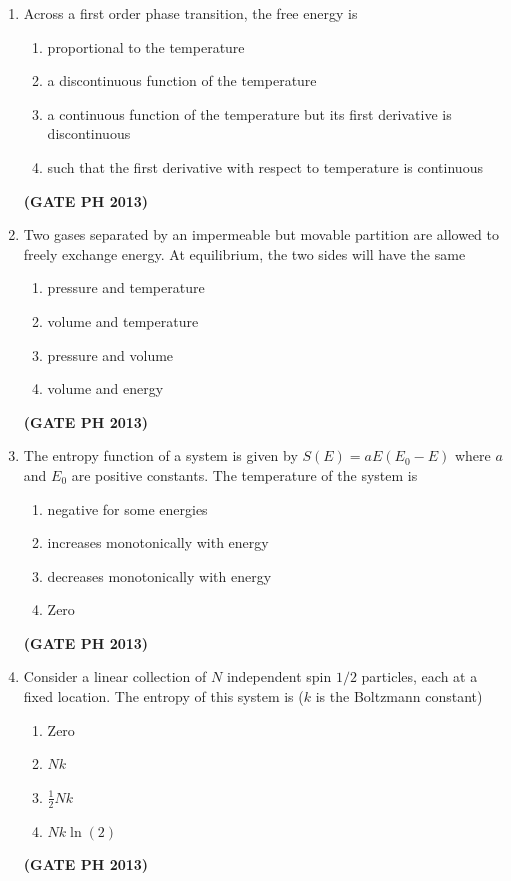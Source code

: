 \documentclass[14pt, a4paper]{extarticle}
\begin{document}
\begin{enumerate}[label=\textbf{Q. \arabic*}]
\item Across a first order phase transition, the free energy is    
    \begin{enumerate}
        \item proportional to the temperature
        \item a discontinuous function of the temperature
        \item a continuous function of the temperature but its first derivative is discontinuous
        \item such that the first derivative with respect to temperature is continuous
    \end{enumerate}
    \hfill \textbf{(GATE PH 2013)}

\item Two gases separated by an impermeable but movable partition are allowed to freely exchange energy. At equilibrium, the two sides will have the same    
    \begin{enumerate}
        \item pressure and temperature
        \item volume and temperature
        \item pressure and volume
        \item volume and energy
    \end{enumerate}
    \hfill \textbf{(GATE PH 2013)}

\item The entropy function of a system is given by $S(E) = a E (E_0 - E)$ where $a$ and $E_0$ are positive constants. The temperature of the system is
\begin{enumerate}
    \item negative for some energies
    \item increases monotonically with energy
    \item decreases monotonically with energy
    \item Zero
\end{enumerate}
\hfill \textbf{(GATE PH 2013)}

\item Consider a linear collection of $N$ independent spin $1/2$ particles, each at a fixed location. The entropy of this system is ($k$ is the Boltzmann constant)
\begin{multicols}{4}
    \begin{enumerate}
        \item Zero
        \item $Nk$
        \item $\frac{1}{2}Nk$
        \item $Nk \ln(2)$
    \end{enumerate}
\end{multicols}
\hfill \textbf{(GATE PH 2013)}


\end{enumerate}
\end{document}

